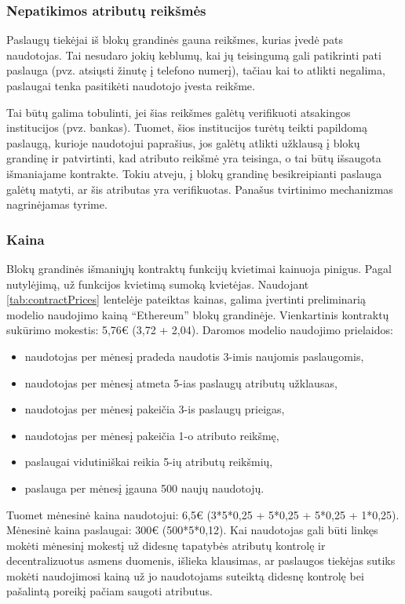 \subsubsection{Nepatikimos atributų reikšmės}

Paslaugų tiekėjai iš blokų grandinės gauna reikšmes, kurias įvedė pats naudotojas. Tai nesudaro jokių keblumų,
kai jų teisingumą gali patikrinti pati paslauga (pvz. atsiųsti žinutę į telefono numerį), tačiau kai to atlikti negalima,
paslaugai tenka pasitikėti naudotojo įvesta reikšme.

Tai būtų galima tobulinti, jei šias reikšmes galėtų verifikuoti
atsakingos institucijos (pvz. bankas). Tuomet, šios institucijos turėtų teikti papildomą paslaugą, kurioje naudotojui
paprašius, jos galėtų atlikti užklausą į blokų grandinę ir patvirtinti, kad atributo reikšmė yra teisinga, o tai būtų
išsaugota išmaniajame kontrakte. Tokiu atveju,
į blokų grandinę besikreipianti paslauga galėtų matyti, ar šis atributas yra verifikuotas. Panašus tvirtinimo mechanizmas
nagrinėjamas \cite{Baars2016} tyrime.

\subsubsection{Kaina}

Blokų grandinės išmaniųjų kontraktų funkcijų kvietimai kainuoja pinigus. Pagal nutylėjimą, už funkcijos kvietimą sumoką kvietėjas.
Naudojant \hypertarget{tab:contractPrices}{\ref{tab:contractPrices}} lentelėje pateiktas kainas, galima įvertinti
preliminarią modelio naudojimo kainą \enquote{Ethereum} blokų grandinėje.
Vienkartinis kontraktų sukūrimo mokestis: 5,76€ (3,72 + 2,04). Daromos modelio naudojimo prielaidos:

\begin{itemize}
    \item naudotojas per mėnesį pradeda naudotis 3-imis naujomis paslaugomis,
    \item naudotojas per mėnesį atmeta 5-ias paslaugų atributų užklausas,
    \item naudotojas per mėnesį pakeičia 3-is paslaugų prieigas,
    \item naudotojas per mėnesį pakeičia 1-o atributo reikšmę,
    \item paslaugai vidutiniškai reikia 5-ių atributų reikšmių,
    \item paslauga per mėnesį įgauna 500 naujų naudotojų.
\end{itemize}

Tuomet mėnesinė kaina naudotojui: 6,5€ (3*5*0,25 + 5*0,25 + 5*0,25 + 1*0,25). Mėnesinė kaina paslaugai: 300€ (500*5*0,12).
Kai naudotojas gali būti linkęs mokėti mėnesinį mokestį už didesnę tapatybės atributų kontrolę ir decentralizuotus asmens duomenis,
išlieka klausimas, ar paslaugos tiekėjas sutiks mokėti naudojimosi kainą už jo naudotojams suteiktą didesnę kontrolę bei pašalintą poreikį
pačiam saugoti atributus.

